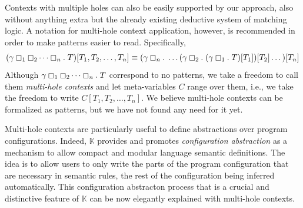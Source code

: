 \documentclass[UTF8,11pt]{article}
\theoremstyle{plain}
\theoremstyle{definition}
\theoremstyle{remark}
\newcommand{\K}{\mbox{$\mathbb{K}$}\xspace}
\newcommand{\hole}{\boxempty}
\begin{document}
Contexts with multiple holes can also be easily supported by our approach,
also without anything extra but the already existing deductive system of
matching logic.
A notation for multi-hole context application, however, is recommended in
order to make patterns easier to read. Specifically,
$$
(\gamma \hole_1 \hole_2 \dots \hole_n . \; T)[T_1,T_2,\dots,T_n]
\equiv (\gamma \hole_n .\; \dots (\gamma\hole_2.\;(\gamma\hole_1.\;T)[T_1])[T_2]\dots)[T_n]
$$
Although $\gamma \hole_1 \hole_2 \dots \hole_n . \; T$ correspond to no
patterns, we take a freedom to call them \emph{multi-hole contexts} and
let meta-variables $C$ range over them, i.e., we take the freedom to write
$C[T_1,T_2,\dots,T_n]$.
We believe multi-hole contexts can be formalized as patterns, but we have
not found any need for it yet.

Multi-hole contexts are particularly useful to define abstractions over
program configurations.
Indeed, \K provides and promotes \emph{configuration abstraction} as a
mechanism to allow compact and modular language semantic definitions.
The idea is to allow users to only write the parts of the program
configuration that are necessary in semantic rules, the rest of the
configuration being inferred automatically.
This configuration abstracton process that is a crucial and distinctive
feature of \K can be now elegantly explained with multi-hole contexts.
\end{document}
